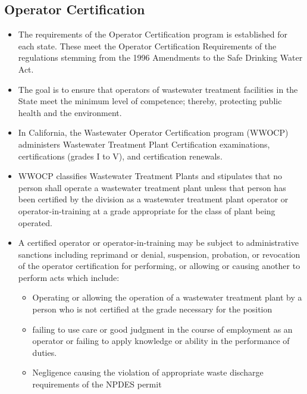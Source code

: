 \documentclass{article}
\begin{document}
\subsection{Operator Certification}
\begin{itemize}
\item The requirements of the Operator Certification program is established for each state.  These meet the Operator Certification Requirements of the regulations stemming from the 1996 Amendments to the Safe Drinking Water Act.
\item The goal is to ensure that operators of wastewater treatment facilities in the State meet the minimum level of competence; thereby, protecting public health and the environment.
\item In California, the Wastewater Operator Certification program (WWOCP) administers Wastewater Treatment Plant Certification examinations, certifications (grades I to V), and certification renewals. 
\item WWOCP classifies Wastewater Treatment Plants and stipulates that no person shall operate a wastewater treatment plant unless that person has been certified by the division as a wastewater treatment plant operator or operator-in-training at a grade appropriate for the class of plant being operated.
\item A certified operator or operator-in-training may be subject to administrative sanctions including reprimand or denial, suspension, probation, or revocation of the operator certification for performing, or allowing or causing another to perform acts which include:
\begin{itemize}
\item Operating or allowing the operation of a wastewater treatment plant by a person who is not certified at the grade necessary for the position
\item failing to use care or good judgment in the course of employment as an operator or failing to apply knowledge or ability in the performance of duties.
\item Negligence causing the violation of appropriate waste discharge requirements of the NPDES permit
\end{itemize}
\end{itemize}


\end{document}

